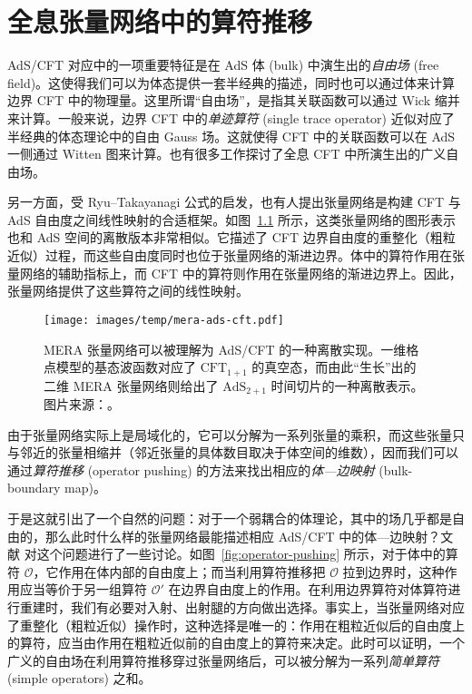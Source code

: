 \chapter{全息张量网络中的算符推移}
\label{chap:operator-pushing}

\tikzset{x=1em, y=1em, node font=\footnotesize}

AdS/CFT 对应\cite{maldacena1999large}中的一项重要特征是在 AdS 体 (bulk) 中演生出的\emph{自由场} (free field)。这使得我们可以为体态提供一套半经典的描述，同时也可以通过体来计算边界 CFT 中的物理量。这里所谓“自由场”，是指其关联函数可以通过 Wick 缩并来计算。一般来说，边界 CFT 中的\emph{单迹算符} (single trace operator) 近似对应了半经典的体态理论中的自由 Gauss 场。这就使得 CFT 中的关联函数可以在 AdS 一侧通过 Witten 图来计算\cite{witten1998anti,gubser1998gauge}。也有很多工作探讨了全息 CFT 中所演生出的广义自由场\cite{dutsch2003generalized,liu2019dimensional,collier2019quantum,nebabu2023bulk}。

另一方面，受 Ryu--Takayanagi 公式\cite{ryu2006holographic}的启发，也有人提出张量网络是构建 CFT 与 AdS 自由度之间线性映射的合适框架\cite{swingle2012entanglement}。如图~\ref{fig:mera-ads-cft} 所示，这类张量网络的图形表示也和 AdS 空间的离散版本非常相似。它描述了 CFT 边界自由度的重整化（粗粒近似）过程，而这些自由度同时也位于张量网络的渐进边界。体中的算符作用在张量网络的辅助指标上，而 CFT 中的算符则作用在张量网络的渐进边界上。因此，张量网络提供了这些算符之间的线性映射\cite{pastawski2015holographic,hayden2016holographic}。

\begin{figure}[htb]
  \centering
  \texttt{[image: images/temp/mera-ads-cft.pdf]}
  \caption[MERA 张量网络与 AdS/CFT]{MERA 张量网络可以被理解为 AdS/CFT 的一种离散实现。一维格点模型的基态波函数对应了 $\text{CFT}_{1+1}$ 的真空态，而由此“生长”出的二维 MERA 张量网络则给出了 $\text{AdS}_{2+1}$ 时间切片的一种离散表示。图片来源：\parencite{evenbly2011tensor}。}
  \label{fig:mera-ads-cft}
\end{figure}

由于张量网络实际上是局域化的，它可以分解为一系列张量的乘积，而这些张量只与邻近的张量相缩并（邻近张量的具体数目取决于体空间的维数），因而我们可以通过\emph{算符推移} (operator pushing) 的方法来找出相应的\emph{体—边映射} (bulk-boundary map)\cite{pastawski2015holographic,bhattacharyya2016exploring,bhattacharyya2018tensor}。

于是这就引出了一个自然的问题：对于一个弱耦合的体理论，其中的场几乎都是自由的，那么此时什么样的张量网络最能描述相应 AdS/CFT 中的体—边映射？文献 \parencite{bhattacharyya2018tensor} 对这个问题进行了一些讨论。如图~\ref{fig:operator-pushing} 所示，对于体中的算符 $\mathcal{O}$，它作用在体内部的自由度上；而当利用算符推移把 $\mathcal{O}$ 拉到边界时，这种作用应当等价于另一组算符 $\mathcal{O}'$ 在边界自由度上的作用。在利用边界算符对体算符进行重建时，我们有必要对入射、出射腿的方向做出选择。事实上，当张量网络对应了重整化（粗粒近似）操作时，这种选择是唯一的：作用在粗粒近似后的自由度上的算符，应当由作用在粗粒近似前的自由度上的算符来决定。此时可以证明，一个广义的自由场在利用算符推移穿过张量网络后，可以被分解为一系列\emph{简单算符} (simple operators) 之和\cite{bhattacharyya2018tensor}。


